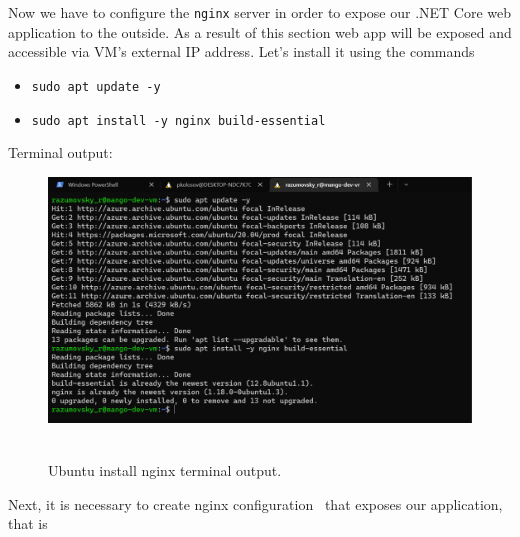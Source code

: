 Now we have to configure the \texttt{nginx} server in order to expose our .NET Core web application to the outside.
As a result of this section web app will be exposed and accessible via VM's external IP address.
Let's install it using the commands
\begin{itemize}
    \item \texttt{sudo apt update -y}
    \item \texttt{sudo apt install -y nginx build-essential}
\end{itemize}
Terminal output:
\begin{figure}[H]
    \centering
    \includegraphics[width=1\textwidth]{img/06_install_nginx}
    ~\caption{Ubuntu install nginx terminal output.}\label{fig:figure15}
\end{figure}
Next, it is necessary to create nginx configuration~\cite{NginxConfig} that exposes our application, that is
